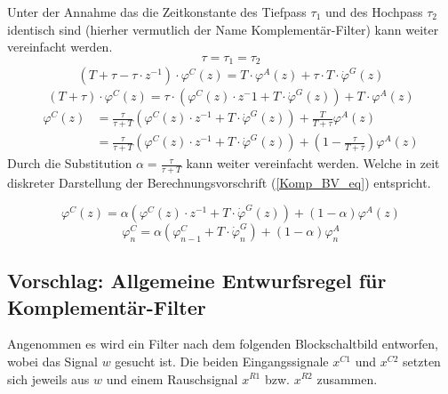 \documentclass{article}
\begin{document}
Unter der Annahme das die Zeitkonstante des Tiefpass $\tau_1$ und des Hochpass $\tau_2$ identisch sind (hierher vermutlich der Name Komplementär-Filter) kann weiter vereinfacht werden.
\begin{equation}
\tau = \tau_1 = \tau_2
\end{equation}
\begin{equation}
\begin{split}
(T + \tau - \tau \cdot z^{-1}) \cdot \varphi^C(z) = T \cdot \varphi^A(z) + \tau \cdot T \cdot \dot{\varphi}^G(z)
\end{split}
\end{equation}
\begin{equation}
(T + \tau) \cdot \varphi^C(z) = \tau \cdot (\varphi^C(z) \cdot z^-1  + T \cdot \dot{\varphi}^G(z)) + T \cdot \varphi^A(z)
\end{equation}
\begin{equation}
\begin{split}
\varphi^C(z) & = \frac{\tau}{\tau + T}(\varphi^C(z) \cdot z^{-1}  + T \cdot \dot{\varphi}^G(z)) + \frac{T}{T + \tau} \varphi^A(z) \\
& = \frac{\tau}{\tau + T}(\varphi^C(z) \cdot z^{-1}  + T \cdot \dot{\varphi}^G(z)) + (1 - \frac{\tau}{T + \tau}) \varphi^A(z)
\end{split}
\end{equation}
Durch die Substitution $\alpha = \frac{\tau}{\tau + T}$ kann weiter vereinfacht werden. Welche in zeit diskreter Darstellung der Berechnungsvorschrift (\ref{Komp_BV_eq}) entspricht.

\begin{equation}
\varphi^C(z)  = \alpha(\varphi^C(z) \cdot z^{-1}  + T \cdot \dot{\varphi}^G(z)) + (1 - \alpha) \varphi^A(z)
\end{equation}
\begin{equation}
\varphi^C_n = \alpha(\varphi^C_{n-1}  + T \cdot \dot{\varphi}^G_n) + (1 - \alpha) \varphi^A_n
\end{equation}

\subsection{Vorschlag: Allgemeine Entwurfsregel für Komplementär-Filter}
Angenommen es wird ein Filter nach dem folgenden Blockschaltbild entworfen, wobei das Signal $w$ gesucht ist. Die beiden Eingangssignale $x^{C1}$ und $x^{C2}$ setzten sich jeweils aus $w$ und einem Rauschsignal $x^{R1}$ bzw. $x^{R2}$ zusammen.
\end{document}
